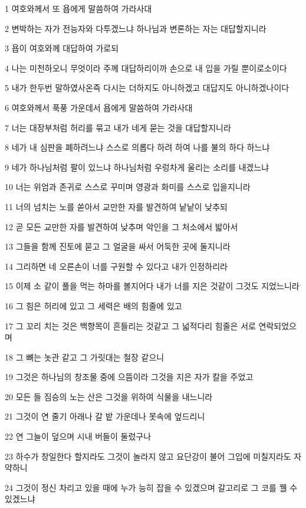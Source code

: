 \par 1 여호와께서 또 욥에게 말씀하여 가라사대
\par 2 변박하는 자가 전능자와 다투겠느냐 하나님과 변론하는 자는 대답할지니라
\par 3 욥이 여호와께 대답하여 가로되
\par 4 나는 미천하오니 무엇이라 주께 대답하리이까 손으로 내 입을 가릴 뿐이로소이다
\par 5 내가 한두번 말하였사온즉 다시는 더하지도 아니하겠고 대답지도 아니하겠나이다
\par 6 여호와께서 푹풍 가운데서 욥에게 말씀하여 가라사대
\par 7 너는 대장부처럼 허리를 묶고 내가 네게 묻는 것을 대답할지니라
\par 8 네가 내 심판을 폐하려느냐 스스로 의롭다 하려 하여 나를 불의 하다 하느냐
\par 9 네가 하나님처럼 팔이 있느냐 하나님처럼 우렁차게 울리는 소리를 내겠느냐
\par 10 너는 위엄과 존귀로 스스로 꾸미며 영광과 화미를 스스로 입을지니라
\par 11 너의 넘치는 노를 쏟아서 교만한 자를 발견하여 낱낱이 낮추되
\par 12 곧 모든 교만한 자를 발견하여 낮추며 악인을 그 처소에서 밟아서
\par 13 그들을 함께 진토에 묻고 그 얼굴을 싸서 어둑한 곳에 둘지니라
\par 14 그리하면 네 오른손이 너를 구원할 수 있다고 내가 인정하리라
\par 15 이제 소 같이 풀을 먹는 하마를 볼지어다 내가 너를 지은 것같이 그것도 지었느니라
\par 16 그 힘은 허리에 있고 그 세력은 배의 힘줄에 있고
\par 17 그 꼬리 치는 것은 백향목이 흔들리는 것같고 그 넓적다리 힘줄은 서로 연락되었으며
\par 18 그 뼈는 놋관 같고 그 가릿대는 철장 같으니
\par 19 그것은 하나님의 창조물 중에 으뜸이라 그것을 지은 자가 칼을 주었고
\par 20 모든 들 짐승의 노는 산은 그것을 위하여 식물을 내느니라
\par 21 그것이 연 줄기 아래나 갈 밭 가운데나 못속에 엎드리니
\par 22 연 그늘이 덮으며 시내 버들이 둘렀구나
\par 23 하수가 창일한다 할지라도 그것이 놀라지 않고 요단강이 불어 그입에 미칠지라도 자약하니
\par 24 그것이 정신 차리고 있을 때에 누가 능히 잡을 수 있겠으며 갈고리로 그 코를 꿸 수 있겠느냐

